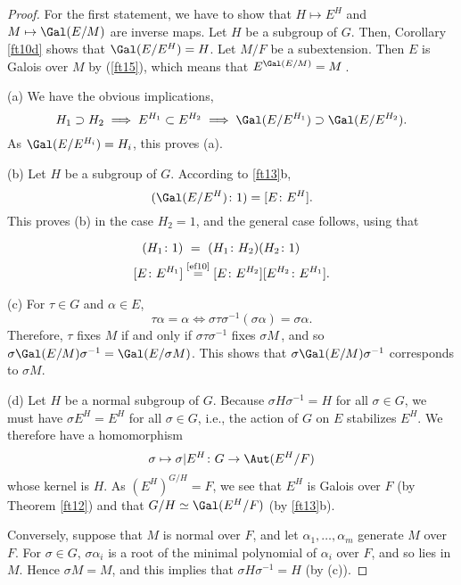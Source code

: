 \documentclass[a4paper,11pt,final,openany]{memoir}
\theoremstyle{nonumberplain}
\newtheorem{proof}{Proof.}
\begin{document}
\begin{proof}
For the first statement, we have to show that $H\mapsto E^{H}$ and
$M\mapsto\Gal(E/M)$ are inverse maps. Let $H$ be a subgroup of $G$. Then,
Corollary \ref{ft10d} shows that $\Gal(E/E^{H})=H$. Let $M/F$ be a
subextension. Then $E$ is Galois over $M$ by (\ref{ft15}), which means that
$E^{\Gal(E/M)}=M\,$.

(a) We have the obvious implications,
\[
H_{1}\supset H_{2}\implies E^{H_{1}}\subset E^{H_{2}}\implies\Gal(E/E^{H_{1}%
})\supset\Gal(E/E^{H_{2}}).
\]
As $\Gal(E/E^{H_{i}})=H_{i}$, this proves (a).

(b) Let $H$ be a subgroup of $G$. According to \ref{ft13}b, \qquad\
\[
(\Gal(E/E^{H})\colon1)=[E\colon E^{H}].
\]
This proves (b) in the case $H_{2}=1$, and the general case follows, using
that
\begin{align*}
(H_{1}\colon1)  &  \overset{\phantom{1.20}}{=}(H_{1}\colon H_{2})(H_{2}%
\colon1)\quad\\
\lbrack E\colon E^{H_{1}}]  &  \overset{\text{\ref{ef10}}}{=}[E\colon
E^{H_{2}}][E^{H_{2}}\colon E^{H_{1}}].
\end{align*}


(c) For $\tau\in G$ and $\alpha\in E$,
\[
\tau\alpha=\alpha\iff\sigma\tau\sigma^{-1}(\sigma\alpha)=\sigma\alpha.
\]
Therefore, $\tau$ fixes $M$ if and only if $\sigma\tau\sigma^{-1}$ fixes
$\sigma M\,$, and so $\sigma\Gal(E/M)\sigma^{-1}=\Gal(E/\sigma M)$. This shows
that $\sigma\Gal(E/M)\sigma^{-1}$ corresponds to $\sigma M.$

(d) Let $H$ be a normal subgroup of $G$. Because $\sigma H\sigma^{-1}=H$ for
all $\sigma\in G$, we must have $\sigma E^{H}=E^{H}$ for all $\sigma\in G$,
i.e., the action of $G$ on $E$ stabilizes $E^{H}$. We therefore have a
homomorphism
\[
\sigma\mapsto\sigma|E^{H}\colon G\rightarrow\Aut(E^{H}/F)
\]
whose kernel is $H$. As $(E^{H})^{G/H}=F$, we see that $E^{H}$ is Galois over
$F$ (by Theorem \ref{ft12}) and that $G/H\simeq\Gal(E^{H}/F)$ (by \ref{ft13}b).

Conversely, suppose that $M$ is normal over $F$, and let $\alpha_{1}%
,\ldots,\alpha_{m}$ generate $M$ over $F$. For $\sigma\in G$, $\sigma
\alpha_{i}$ is a root of the minimal polynomial of $\alpha_{i}$ over $F$, and
so lies in $M$. Hence $\sigma M=M$, and this implies that $\sigma H\sigma
^{-1}=H$ (by (c)).
\end{proof}
\end{document}
